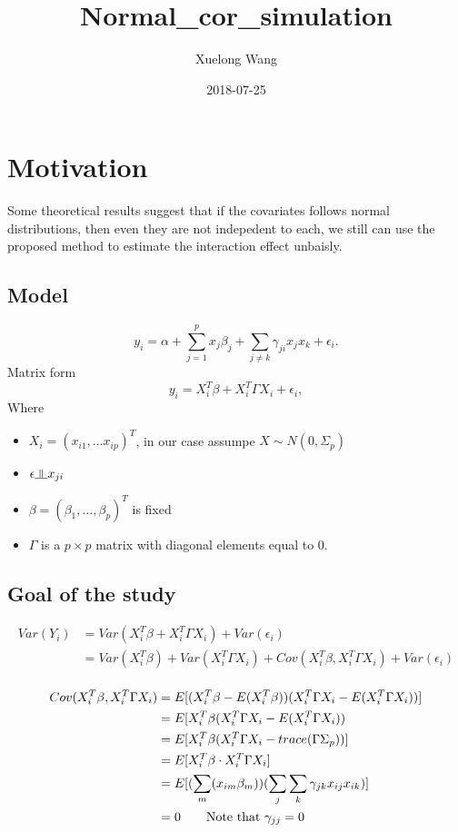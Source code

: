 \documentclass[]{article}
\title{Normal\_cor\_simulation}
\author{Xuelong Wang}
\date{2018-07-25}
\providecommand{\tightlist}{%
  \setlength{\itemsep}{0pt}\setlength{\parskip}{0pt}}
\newcommand{\indep}{\rotatebox[origin=c]{90}{$\models$}}
\begin{document}
\maketitle

{
\setcounter{tocdepth}{2}
\tableofcontents
}
\section{Motivation}\label{motivation}

Some theoretical results suggest that if the covariates follows normal
distributions, then even they are not indepedent to each, we still can
use the proposed method to estimate the interaction effect unbaisly.

\subsection{Model}\label{model}

\[
  y_i = \alpha + \sum_{j = 1}^p x_j\beta_j + \sum_{j \neq k} \gamma_{ji}x_jx_k + \epsilon_i.
\] Matrix form \[
  y_i = X_i^T\beta + X_i^T\Gamma X_i + \epsilon_i,
\] Where

\begin{itemize}
\tightlist
\item
  \(X_i = (x_{i1}, \dots x_{ip})^T\), in our case assumpe
  \(X \sim N(0, \Sigma_p)\)\\
\item
  \(\epsilon \indep x_{ji}\)\\
\item
  \(\beta = (\beta_1, \dots, \beta_p)^T\) is fixed\\
\item
  \(\Gamma\) is a \(p \times p\) matrix with diagonal elements equal to
  0.
\end{itemize}

\subsection{Goal of the study}\label{goal-of-the-study}

\begin{align*}
Var(Y_i) &= Var(X_i^T\beta + X_i^T\Gamma X_i) + Var(\epsilon_i) \\
         &= Var(X_i^T\beta) + Var(X_i^T\Gamma X_i) + Cov(X_i^T\beta, X_i^T\Gamma X_i) + Var(\epsilon_i) \\
\end{align*}

\begin{align*}
Cov(X_i^T\beta, X_i^T\Gamma X_i) &= E[(X_i^T\beta - E(X_i^T\beta))(X_i^T\Gamma X_i - E(X_i^T\Gamma X_i))]\\
    &= E[X_i^T\beta(X_i^T\Gamma X_i - E(X_i^T\Gamma X_i)) \\
    &= E[X_i^T\beta(X_i^T\Gamma X_i - trace(\Gamma\Sigma_p))] \\
    &= E[X_i^T\beta \cdot X_i^T\Gamma X_i] \\
    &= E[(\sum_m(x_{im}\beta_m))(\sum_j\sum_k\gamma_{jk}x_{ij} x_{ik}) ] \\
    & = 0 \tag*{Note that $\gamma_{jj} = 0$}
\end{align*}
\end{document}

